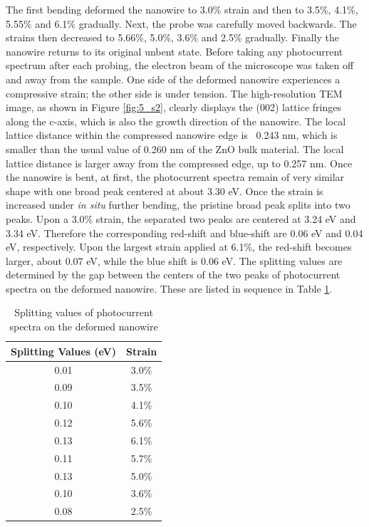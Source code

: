 The first bending deformed the nanowire to 3.0\% strain and then to 3.5\%, 4.1\%, 5.55\% and 6.1\% gradually. 
Next, the probe was carefully moved backwards. 
The strains then decreased to 5.66\%, 5.0\%, 3.6\% and 2.5\% gradually. 
Finally the nanowire returns to its original unbent state. 
Before taking any photocurrent spectrum after each probing, the electron beam of the microscope was taken off and away from the sample. 
One side of the deformed nanowire experiences a compressive strain; the other side is under tension. 
The high-resolution TEM image, as shown in Figure \ref{fig:5_s2}, clearly displays the (002) lattice fringes along the c-axis, which is also the growth direction of the nanowire.\cite{zhang2015opto} 
The local lattice distance within the compressed nanowire edge is ~0.243 nm, which is smaller than the usual value of 0.260 nm of the ZnO bulk material.\cite{L.2011} 
The local lattice distance is larger away from the compressed edge, up to 0.257 nm. 
Once the nanowire is bent, at first, the photocurrent spectra remain of very similar shape with one broad peak centered at about 3.30 eV. 
Once the strain is increased under {\em in situ} further bending, the pristine broad peak splits into two peaks. 
Upon a 3.0\% strain, the separated two peaks are centered at 3.24 eV and 3.34 eV. 
Therefore the corresponding red-shift and blue-shift are 0.06 eV and 0.04 eV, respectively. 
Upon the largest strain applied at 6.1\%, the red-shift becomes larger, about 0.07 eV, while the blue shift is 0.06 eV. 
The splitting values are determined by the gap between the centers of the two peaks of photocurrent spectra on the deformed nanowire. These are listed in sequence in Table \ref{tab:5_1}. 
\begin{table}
    \centering
    \begin{tabular}{c|c}
    \hline
         Splitting Values (eV) & Strain\\
         \hline
         0.01 & 3.0\%\\ 
         0.09 & 3.5\%\\
         0.10 & 4.1\%\\
         0.12 & 5.6\%\\
         0.13 & 6.1\%\\
         0.11 & 5.7\%\\
         0.13 & 5.0\%\\
         0.10 & 3.6\%\\
         0.08 & 2.5\%\\
         \hline
    \end{tabular}
    \caption{Splitting values of photocurrent spectra on the deformed nanowire}
    \label{tab:5_1}
\end{table}
 
